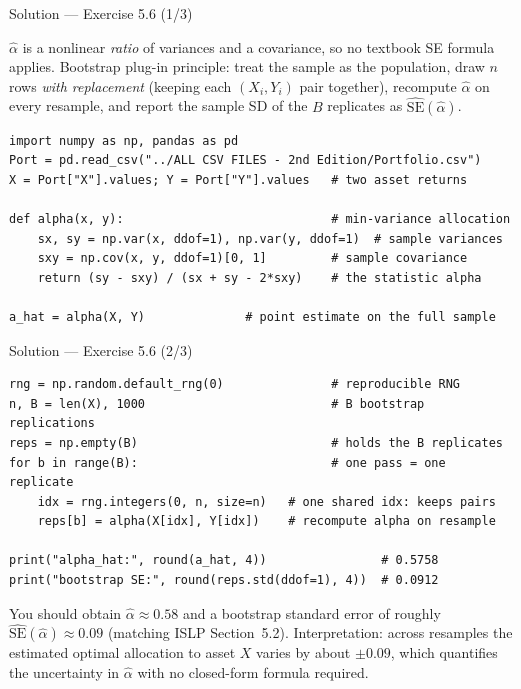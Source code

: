\documentclass[aspectratio=169,11pt]{beamer}
\begin{document}
\begin{frame}[fragile]{Solution --- Exercise 5.6 (1/3)}
  \begin{solutionbox}
    $\hat\alpha$ is a nonlinear \emph{ratio} of variances and a
    covariance, so no textbook SE formula applies. Bootstrap plug-in
    principle: treat the sample as the population, draw $n$ rows
    \emph{with replacement} (keeping each $(X_i, Y_i)$ pair together),
    recompute $\hat\alpha$ on every resample, and report the sample SD
    of the $B$ replicates as $\widehat{\mathrm{SE}}(\hat\alpha)$.
  \end{solutionbox}
  \begin{lstlisting}
import numpy as np, pandas as pd
Port = pd.read_csv("../ALL CSV FILES - 2nd Edition/Portfolio.csv")
X = Port["X"].values; Y = Port["Y"].values   # two asset returns

def alpha(x, y):                             # min-variance allocation
    sx, sy = np.var(x, ddof=1), np.var(y, ddof=1)  # sample variances
    sxy = np.cov(x, y, ddof=1)[0, 1]         # sample covariance
    return (sy - sxy) / (sx + sy - 2*sxy)    # the statistic alpha

a_hat = alpha(X, Y)              # point estimate on the full sample
  \end{lstlisting}
\end{frame}

\begin{frame}[fragile]{Solution --- Exercise 5.6 (2/3)}
  \begin{lstlisting}
rng = np.random.default_rng(0)               # reproducible RNG
n, B = len(X), 1000                          # B bootstrap replications
reps = np.empty(B)                           # holds the B replicates
for b in range(B):                           # one pass = one replicate
    idx = rng.integers(0, n, size=n)   # one shared idx: keeps pairs
    reps[b] = alpha(X[idx], Y[idx])    # recompute alpha on resample

print("alpha_hat:", round(a_hat, 4))                # 0.5758
print("bootstrap SE:", round(reps.std(ddof=1), 4))  # 0.0912
  \end{lstlisting}
  \begin{solutionbox}
    You should obtain $\hat\alpha \approx 0.58$ and a bootstrap standard
    error of roughly $\widehat{\mathrm{SE}}(\hat\alpha) \approx 0.09$
    (matching ISLP Section~5.2). Interpretation: across resamples the
    estimated optimal allocation to asset $X$ varies by about $\pm 0.09$,
    which quantifies the uncertainty in $\hat\alpha$ with no closed-form
    formula required.
  \end{solutionbox}
\end{frame}
\end{document}
